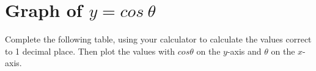           
        
      
     
            
        
\label{m39414*secfhsst!!!underscore!!!id2385}
            \section{  Graph of $y=cos~\theta $}
            \nopagebreak
            
\label{m39414*uid8032} Complete the following table, using your calculator to calculate the values correct to 1 decimal place. Then plot the values with \begin{math}cos\theta \end{math} on the \begin{math}y\end{math}-axis and \begin{math}\theta \end{math} on the \begin{math}x\end{math}-axis.\par 
        
    
      
